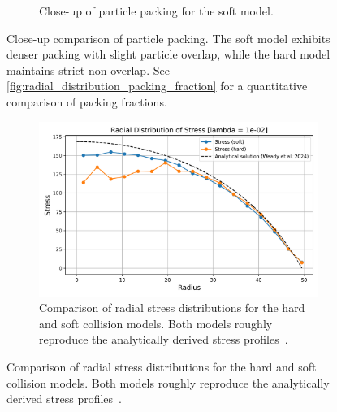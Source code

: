 \documentclass[conference]{IEEEtran}
\begin{document}
\begin{figure}[H]
\begin{subfigure}[b]{0.49\columnwidth}
        \caption{Close-up of particle packing for the soft model.}
        \label{fig:packing_soft}
    \end{subfigure}
    \caption{Close-up comparison of particle packing. The soft model exhibits denser packing with slight particle overlap, while the hard model maintains strict non-overlap. See \autoref{fig:radial_distribution_packing_fraction} for a quantitative comparison of packing fractions.}
    \label{fig:dense_packing_comparison}
\end{figure}



\newpage

\begin{figure}[H]
    \centering
    \begin{subfigure}[b]{\linewidth}
        \centering
        \includegraphics[width=\linewidth]{figures/comparisons/radial_distribution_stress.png}
        \caption{Comparison of radial stress distributions for the hard and soft collision models. Both models roughly reproduce the analytically derived stress profiles~\cite{Weady2024}.}
        \label{fig:radial_distribution_stress}
    \end{subfigure}

    \vspace{0.5em}


\end{figure}
\end{document}
